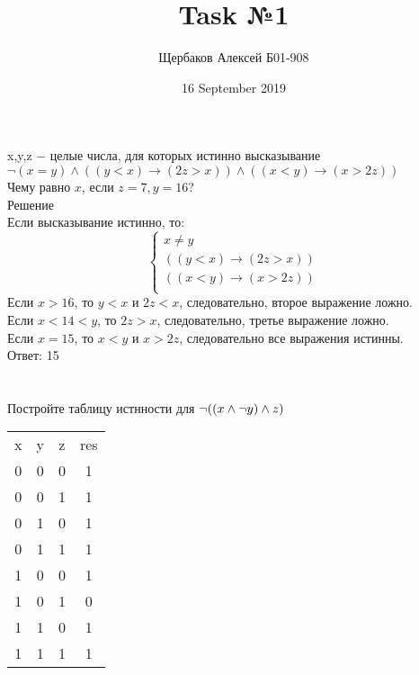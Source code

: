 \documentclass{article}
\title{Task №1}
\author{Щербаков Алексей Б01-908}
\date{16 September 2019}
\begin{document}
\maketitle
\section{}
x,y,z $-$ целые числа, для которых истинно высказывание \\
\begin{math}
\neg(x = y)\wedge((y<x)\rightarrow(2z>x))\wedge((x<y)\rightarrow(x>2z))
\end{math}
\\Чему равно $x$, если $z=7, y=16$?
\\Решение
\\Если высказывание истинно, то:
\begin{equation*}
 \begin{cases}
   x\neq y\\
   ((y<x)\rightarrow(2z>x))\\
   ((x<y)\rightarrow(x>2z))\\
 \end{cases}
\end{equation*}
Если $x>16$, то $y<x$ и $2z<x$, следовательно, второе выражение ложно.\\
Если $x<14<y$, то $2z>x$, следовательно, третье выражение ложно.\\
Если $x=15$, то $x<y$ и $x>2z$, следовательно все выражения истинны.
\\Ответ: 15



\section{}
Постройте таблицу истнности для $\neg((x\wedge \neg y) \wedge z)\\$
\begin{center}
\begin{tabular}{ |c|c|c|c| } 
 \hline
 x & y & z & res \\
 0 & 0 & 0 & 1 \\ 
 0 & 0 & 1 & 1 \\ 
 0 & 1 & 0 & 1 \\ 
 0 & 1 & 1 & 1 \\
 1 & 0 & 0 & 1 \\ 
 1 & 0 & 1 & 0 \\
 1 & 1 & 0 & 1 \\ 
 1 & 1 & 1 & 1 \\ 

 \hline
\end{tabular}
\end{center}
\end{document}
